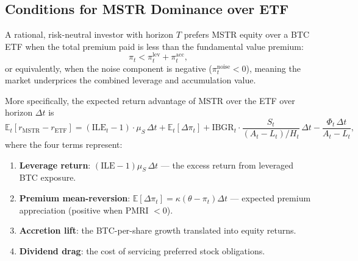 \subsection{Conditions for MSTR Dominance over ETF}
\label{subsec:mstr_dominates}

\begin{theorem}
\label{thm:mstr_dominates}
A rational, risk-neutral investor with horizon $T$ prefers MSTR equity over a BTC ETF when the total premium paid is less than the fundamental value premium:
\begin{equation}
\label{eq:mstr_dominance}
  \pi_t < \pi_t^{\mathrm{lev}} + \pi_t^{\mathrm{acc}},
\end{equation}
or equivalently, when the noise component is negative ($\pi_t^{\mathrm{noise}} < 0$), meaning the market underprices the combined leverage and accumulation value.

More specifically, the expected return advantage of MSTR over the ETF over horizon $\Delta t$ is
\begin{equation}
\label{eq:return_advantage}
  \mathbb{E}_t[r_{\mathrm{MSTR}} - r_{\mathrm{ETF}}] = (\mathrm{ILE}_t - 1) \cdot \mu_S\, \Delta t + \mathbb{E}_t[\Delta\pi_t] + \mathrm{IBGR}_t \cdot \frac{S_t}{(A_t - L_t) / H_t}\, \Delta t - \frac{\Phi_t\, \Delta t}{A_t - L_t},
\end{equation}
where the four terms represent:
\begin{enumerate}
  \item \textbf{Leverage return}: $(\mathrm{ILE} - 1)\mu_S\,\Delta t$ --- the excess return from leveraged BTC exposure.
  \item \textbf{Premium mean-reversion}: $\mathbb{E}[\Delta\pi_t] = \kappa(\theta - \pi_t)\Delta t$ --- expected premium appreciation (positive when PMRI $< 0$).
  \item \textbf{Accretion lift}: the BTC-per-share growth translated into equity returns.
  \item \textbf{Dividend drag}: the cost of servicing preferred stock obligations.
\end{enumerate}
\end{theorem}

